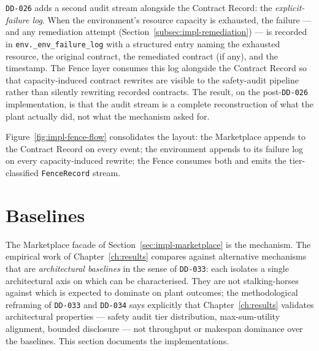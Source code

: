 \texttt{DD-026} adds a second audit stream alongside the Contract
Record: the \emph{explicit-failure log}. When the environment's resource
capacity is exhausted, the failure --- and any remediation attempt
(Section~\ref{subsec:impl-remediation}) --- is recorded in
\texttt{env.\_env\_failure\_log} with a structured entry naming the
exhausted resource, the original contract, the remediated contract (if
any), and the timestamp. The Fence layer consumes this log alongside
the Contract Record so that capacity-induced contract rewrites are
visible to the safety-audit pipeline rather than silently rewriting
recorded contracts. The result, on the post-\texttt{DD-026}
implementation, is that the audit stream is a complete reconstruction
of what the plant actually did, not what the mechanism asked for.

Figure~\ref{fig:impl-fence-flow} consolidates the layout: the
Marketplace appends to the Contract Record on every event; the
environment appends to its failure log on every capacity-induced
rewrite; the Fence consumes both and emits the tier-classified
\texttt{FenceRecord} stream.


\section{Baselines}
\label{sec:impl-baselines}

The Marketplace facade of Section~\ref{sec:impl-marketplace} is the
\NEXUS{} mechanism. The empirical work of Chapter~\ref{ch:results}
compares \NEXUS{} against alternative mechanisms that are
\emph{architectural baselines} in the sense of \texttt{DD-033}: each
isolates a single architectural axis on which \NEXUS{} can be
characterised. They are not stalking-horses against which \NEXUS{} is
expected to dominate on plant outcomes; the methodological reframing of
\texttt{DD-033} and \texttt{DD-034} says explicitly that
Chapter~\ref{ch:results} validates architectural properties --- safety
audit tier distribution, max-sum-utility alignment, bounded disclosure
--- not throughput or makespan dominance over the baselines. This
section documents the implementations.

